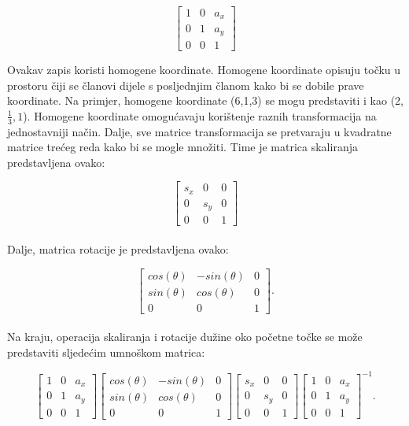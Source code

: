 \documentclass{foi}
\begin{document}
\[
\begin{bmatrix}
	1 & 0 & a_x\\
	0 & 1 & a_y\\
	0 & 0 & 1
\end{bmatrix}
\]

Ovakav zapis koristi homogene koordinate. Homogene koordinate opisuju točku u prostoru čiji se članovi dijele s posljednjim članom kako bi se dobile prave koordinate. Na primjer, homogene koordinate (6,1,3) se mogu predstaviti i kao (2,$\frac{1}{3}, 1$). Homogene koordinate omogućavaju korištenje raznih transformacija na jednostavniji način. Dalje, sve matrice transformacija se pretvaraju u kvadratne matrice trećeg reda kako bi se mogle množiti. Time je matrica skaliranja predstavljena ovako:

\[
\begin{bmatrix}
	s_x & 0 & 0\\
	0 & s_y & 0\\
	0 & 0 & 1
\end{bmatrix}
\]
\\Dalje, matrica rotacije je predstavljena ovako:

\[
\begin{bmatrix}
	cos(\theta) & -sin(\theta) & 0\\
	sin(\theta) & cos(\theta) & 0\\
	0 & 0 & 1
\end{bmatrix}.
\]
\\Na kraju, operacija skaliranja i rotacije dužine oko početne točke se može predstaviti sljedećim umnoškom matrica:

\[
\begin{bmatrix}
	1 & 0 & a_x\\
	0 & 1 & a_y\\
	0 & 0 & 1
\end{bmatrix}
\begin{bmatrix}
	cos(\theta) & -sin(\theta) & 0\\
	sin(\theta) & cos(\theta) & 0\\
	0 & 0 & 1
\end{bmatrix}
\begin{bmatrix}
	s_x & 0 & 0\\
	0 & s_y & 0\\
	0 & 0 & 1
\end{bmatrix}
\begin{bmatrix}
1 & 0 & a_x\\
0 & 1 & a_y\\
0 & 0 & 1
\end{bmatrix}^{-1}.
\]
\end{document}
